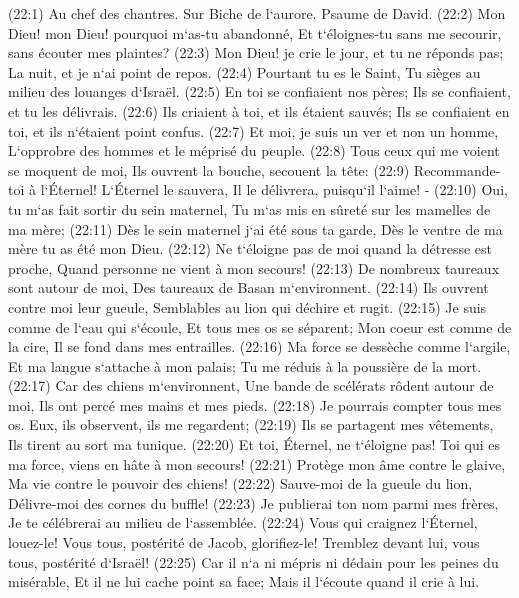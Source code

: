 \verse (22:1) Au chef des chantres. Sur Biche de l`aurore. Psaume de David. (22:2) Mon Dieu! mon Dieu! pourquoi m`as-tu abandonné, Et t`éloignes-tu sans me secourir, sans écouter mes plaintes? 
\verse (22:3) Mon Dieu! je crie le jour, et tu ne réponds pas; La nuit, et je n`ai point de repos. 
\verse (22:4) Pourtant tu es le Saint, Tu sièges au milieu des louanges d`Israël. 
\verse (22:5) En toi se confiaient nos pères; Ils se confiaient, et tu les délivrais. 
\verse (22:6) Ils criaient à toi, et ils étaient sauvés; Ils se confiaient en toi, et ils n`étaient point confus. 
\verse (22:7) Et moi, je suis un ver et non un homme, L`opprobre des hommes et le méprisé du peuple. 
\verse (22:8) Tous ceux qui me voient se moquent de moi, Ils ouvrent la bouche, secouent la tête: 
\verse (22:9) Recommande-toi à l`Éternel! L`Éternel le sauvera, Il le délivrera, puisqu`il l`aime! - 
\verse (22:10) Oui, tu m`as fait sortir du sein maternel, Tu m`as mis en sûreté sur les mamelles de ma mère; 
\verse (22:11) Dès le sein maternel j`ai été sous ta garde, Dès le ventre de ma mère tu as été mon Dieu. 
\verse (22:12) Ne t`éloigne pas de moi quand la détresse est proche, Quand personne ne vient à mon secours! 
\verse (22:13) De nombreux taureaux sont autour de moi, Des taureaux de Basan m`environnent. 
\verse (22:14) Ils ouvrent contre moi leur gueule, Semblables au lion qui déchire et rugit. 
\verse (22:15) Je suis comme de l`eau qui s`écoule, Et tous mes os se séparent; Mon coeur est comme de la cire, Il se fond dans mes entrailles. 
\verse (22:16) Ma force se dessèche comme l`argile, Et ma langue s`attache à mon palais; Tu me réduis à la poussière de la mort. 
\verse (22:17) Car des chiens m`environnent, Une bande de scélérats rôdent autour de moi, Ils ont percé mes mains et mes pieds. 
\verse (22:18) Je pourrais compter tous mes os. Eux, ils observent, ils me regardent; 
\verse (22:19) Ils se partagent mes vêtements, Ils tirent au sort ma tunique. 
\verse (22:20) Et toi, Éternel, ne t`éloigne pas! Toi qui es ma force, viens en hâte à mon secours! 
\verse (22:21) Protège mon âme contre le glaive, Ma vie contre le pouvoir des chiens! 
\verse (22:22) Sauve-moi de la gueule du lion, Délivre-moi des cornes du buffle! 
\verse (22:23) Je publierai ton nom parmi mes frères, Je te célébrerai au milieu de l`assemblée. 
\verse (22:24) Vous qui craignez l`Éternel, louez-le! Vous tous, postérité de Jacob, glorifiez-le! Tremblez devant lui, vous tous, postérité d`Israël! 
\verse (22:25) Car il n`a ni mépris ni dédain pour les peines du misérable, Et il ne lui cache point sa face; Mais il l`écoute quand il crie à lui. 
